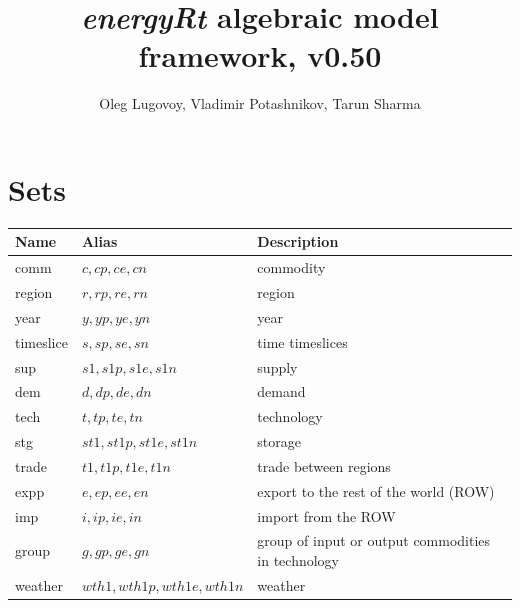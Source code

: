 \documentclass{article}
\title{\emph{energyRt} algebraic model framework, v0.50}
\author{Oleg Lugovoy, Vladimir Potashnikov, Tarun Sharma}
\begin{document}
\maketitle
\section*{Sets}
\begin{longtable}{| l | l | l |}
\hline
\bf{Name} & \bf{Alias} & \bf{Description} \\
 \hline
comm & $c,cp,ce,cn$ & commodity \\
 \hline
region & $r,rp,re,rn$ & region \\
 \hline
year & $y,yp,ye,yn$ & year \\
 \hline
timeslice & $s,sp,se,sn$ & time timeslices \\
 \hline
sup & $s1,s1p,s1e,s1n$ & supply \\
 \hline
dem & $d,dp,de,dn$ & demand \\
 \hline
tech & $t,tp,te,tn$ & technology \\
 \hline
stg & $st1,st1p,st1e,st1n$ & storage \\
 \hline
trade & $t1,t1p,t1e,t1n$ & trade between regions \\
 \hline
expp & $e,ep,ee,en$ & export to the rest of the world (ROW) \\
 \hline
imp & $i,ip,ie,in$ & import from the ROW \\
 \hline
group & $g,gp,ge,gn$ & group of input or output commodities in technology \\
 \hline
weather & $wth1,wth1p,wth1e,wth1n$ & weather \\
 \hline
\end{longtable}
\end{document}
